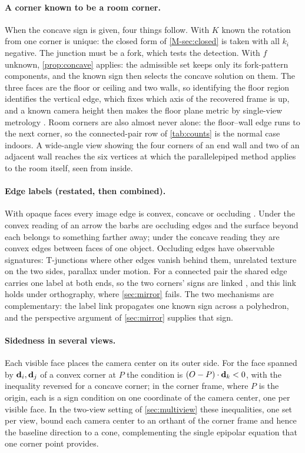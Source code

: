 \paragraph{A corner known to be a room corner.} When the concave sign is given, four things follow. With $K$ known the rotation from one corner is unique: the closed form of \cref{M-sec:closed} is taken with all $k_i$ negative. The junction must be a fork, which tests the detection. With $f$ unknown, \cref{prop:concave} applies: the admissible set keeps only its fork-pattern components, and the known sign then selects the concave solution on them. The three faces are the floor or ceiling and two walls, so identifying the floor region identifies the vertical edge, which fixes which axis of the recovered frame is up, and a known camera height then makes the floor plane metric by single-view metrology \citep{criminisi2000}. Room corners are also almost never alone: the floor--wall edge runs to the next corner, so the connected-pair row of \cref{tab:counts} is the normal case indoors. A wide-angle view showing the four corners of an end wall and two of an adjacent wall reaches the six vertices at which the parallelepiped method applies to the room itself, seen from inside.

\paragraph{Edge labels (restated, then combined).} With opaque faces every image edge is convex, concave or occluding \citep{huffman1971,clowes1971,waltz1975}. Under the convex reading of an arrow the barbs are occluding edges and the surface beyond each belongs to something farther away; under the concave reading they are convex edges between faces of one object. Occluding edges have observable signatures: T-junctions where other edges vanish behind them, unrelated texture on the two sides, parallax under motion. For a connected pair the shared edge carries one label at both ends, so the two corners' signs are linked \citep[Proposition~6]{kanatani1986}, and this link holds under orthography, where \cref{sec:mirror} fails. The two mechanisms are complementary: the label link propagates one known sign across a polyhedron, and the perspective argument of \cref{sec:mirror} supplies that sign.

\paragraph{Sidedness in several views.} Each visible face places the camera center on its outer side. For the face spanned by $\mathbf{d}_i,\mathbf{d}_j$ of a convex corner at $P$ the condition is $(O-P)\cdot\mathbf{d}_k<0$, with the inequality reversed for a concave corner; in the corner frame, where $P$ is the origin, each is a sign condition on one coordinate of the camera center, one per visible face. In the two-view setting of \cref{sec:multiview} these inequalities, one set per view, bound each camera center to an orthant of the corner frame and hence the baseline direction to a cone, complementing the single epipolar equation that one corner point provides.

